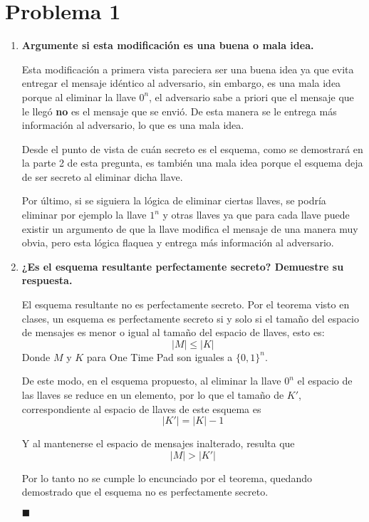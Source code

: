\documentclass[twoside]{tareas}
\begin{document}
\maketitle

\section*{Problema 1}

\begin{enumerate}
    \item \textbf{Argumente si esta modificación es una buena o mala idea.}

    Esta modificación a primera vista pareciera ser una buena idea ya que evita entregar el mensaje idéntico al adversario, sin embargo, es una mala idea porque al eliminar la llave $0^n$, el adversario sabe a priori que el mensaje que le llegó \textbf{no} es el mensaje que se envió. De esta manera se le entrega más información al adversario, lo que es una mala idea.

    Desde el punto de vista de cuán secreto es el esquema, como se demostrará en la parte 2 de esta pregunta, es también una mala idea porque el esquema deja de ser secreto al eliminar dicha llave.

    Por último, si se siguiera la lógica de eliminar ciertas llaves, se podría eliminar por ejemplo la llave $1^n$ y otras llaves ya que para cada llave puede existir un argumento de que la llave modifica el mensaje de una manera muy obvia, pero esta lógica flaquea y entrega más información al adversario.

    \item \textbf{¿Es el esquema resultante perfectamente secreto? Demuestre su respuesta.}

    El esquema resultante no es perfectamente secreto. Por el teorema visto en clases, un esquema es perfectamente secreto si y solo si el tamaño del espacio de mensajes es menor o igual al tamaño del espacio de llaves, esto es:
    $$|M| \leq |K|$$
    Donde $M$ y $K$ para One Time Pad son iguales a $\{0,1\}^n$.

    De este modo, en el esquema propuesto, al eliminar la llave $0^n$ el espacio de las llaves se reduce en un elemento, por lo que el tamaño de $K'$, correspondiente al espacio de llaves de este esquema es
    $$|K'| = |K| - 1$$

    Y al mantenerse el espacio de mensajes inalterado, resulta que
    $$|M| > |K'|$$

    Por lo tanto no se cumple lo encunciado por el teorema, quedando demostrado que el esquema no es perfectamente secreto.
    \begin{flushright} $\blacksquare$ \end{flushright}
\end{enumerate}
\end{document}
